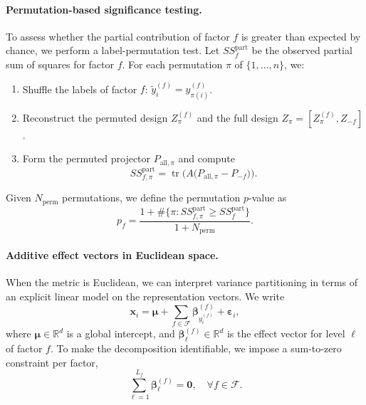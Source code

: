 \documentclass[10pt,twocolumn,letterpaper]{article}
\begin{document}
\paragraph{Permutation-based significance testing.}
To assess whether the partial contribution of factor $f$ is greater than expected by chance, we perform a label-permutation test. Let $SS_f^{\text{part}}$ be the observed partial sum of squares for factor $f$. For each permutation $\pi$ of $\{1,\dots,n\}$, we:

\begin{enumerate}
    \item Shuffle the labels of factor $f$: $\tilde{y}_i^{(f)} = y_{\pi(i)}^{(f)}$.
    \item Reconstruct the permuted design $Z_\pi^{(f)}$ and the full design $Z_\pi = [Z_\pi^{(f)}, Z_{-f}]$.
    \item Form the permuted projector $P_{\text{all},\pi}$ and compute
    \begin{equation}
        SS_{f,\pi}^{\text{part}} = \operatorname{tr}\!\big(A \big(P_{\text{all},\pi} - P_{-f}\big)\big).
    \end{equation}
\end{enumerate}

Given $N_{\text{perm}}$ permutations, we define the permutation $p$-value as
\begin{equation}
    p_f = \frac{1 + \#\{\pi: SS_{f,\pi}^{\text{part}} \geq SS_f^{\text{part}}\}}{1 + N_{\text{perm}}}.
\end{equation}

\paragraph{Additive effect vectors in Euclidean space.}
When the metric is Euclidean, we can interpret variance partitioning in terms of an explicit linear model on the representation vectors. We write
\begin{equation}
    \mathbf{x}_i = \boldsymbol{\mu} + \sum_{f \in \mathcal{F}} \boldsymbol{\beta}^{(f)}_{y_i^{(f)}} + \boldsymbol{\varepsilon}_i,
    \label{eq:additive-model}
\end{equation}
where $\boldsymbol{\mu} \in \mathbb{R}^d$ is a global intercept, and $\boldsymbol{\beta}^{(f)}_\ell \in \mathbb{R}^d$ is the effect vector for level $\ell$ of factor $f$. To make the decomposition identifiable, we impose a sum-to-zero constraint per factor,
\begin{equation}
    \sum_{\ell=1}^{L_f} \boldsymbol{\beta}^{(f)}_\ell = \mathbf{0}, \quad \forall f \in \mathcal{F}.
\end{equation}
\end{document}
